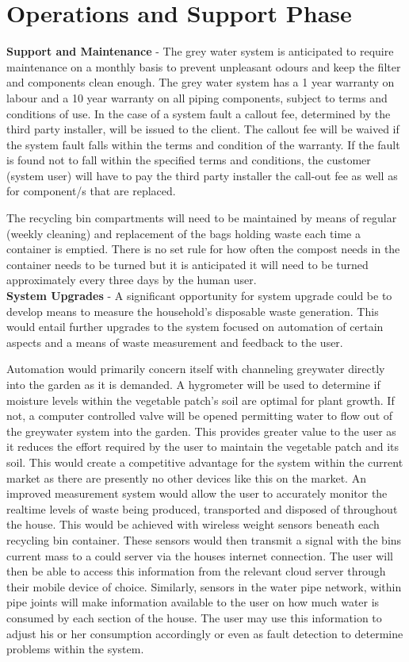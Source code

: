 \documentclass[a4paper,11pt,fleqn]{report}
\begin{document}
\section{Operations and Support Phase}
\textbf{Support and Maintenance} - The grey water system is anticipated to require maintenance on a monthly basis to prevent unpleasant odours and keep the filter and components clean enough. The grey water system has a 1 year warranty on labour and a 10 year warranty on all piping components, subject to terms and conditions of use. In the case of a system fault a callout fee, determined by the third party installer,  will be issued to the client. The callout fee will be waived if the system fault falls within the terms and condition of the warranty. If the fault is found not to fall within the specified terms and conditions, the customer (system user) will have to pay the third party installer the call-out fee as well as for component/s that are replaced.

The recycling bin compartments will need to be maintained by means of regular (weekly cleaning) and replacement of the bags holding waste each time a container is emptied. There is no set rule for how often the compost needs in the container needs to be turned but it is anticipated it will need to be turned approximately every three days by the human user. \\

\textbf{System Upgrades} - A significant opportunity for system upgrade could be to develop means to measure the household's disposable waste generation. This would entail further upgrades to the system focused on automation of certain aspects and a means of waste measurement and feedback to the user. 

Automation would primarily concern itself with channeling greywater directly into the garden as it is demanded. A hygrometer will be used to determine if moisture levels within the vegetable patch's soil are optimal for plant growth. If not, a computer controlled valve will be opened permitting water to flow out of the greywater system into the garden. This provides greater value to the user as it reduces the effort required by the user to maintain the vegetable patch and its soil. This would create a competitive advantage for the system within the current market as there are presently no other devices like this on the market.
An improved measurement system would allow the user to accurately monitor the realtime levels of waste being produced, transported and disposed of throughout the house. This would be achieved with wireless weight sensors beneath each recycling bin container. These sensors would then transmit a signal with the bins current mass to a could server via the houses internet connection. The user will then be able to access this information from the relevant cloud server through their mobile device of choice. Similarly, sensors in the water pipe network, within pipe joints will make information available to the user on how much water is consumed by each section of the house. The user may use this information to adjust his or her consumption accordingly or even as fault detection to determine problems within the system. 
\end{document}
